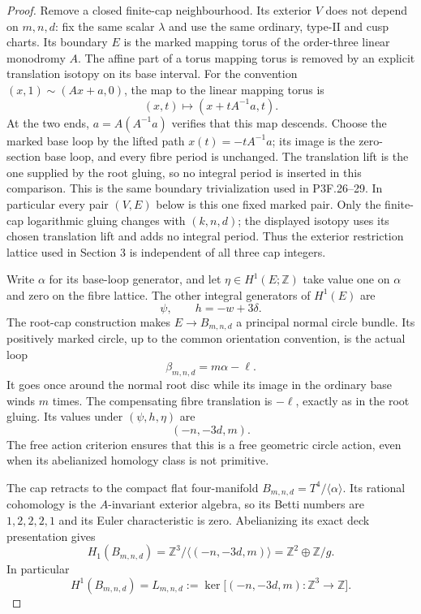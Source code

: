 \begin{proof}
Remove a closed finite-cap neighbourhood. Its exterior \(V\) does not depend on \(m,n,d\): fix the same scalar \(\lambda\) and use the same ordinary, type-II and cusp charts. Its boundary \(E\) is the marked mapping torus of the order-three linear monodromy \(A\). The affine part of a torus mapping torus is removed by an explicit translation isotopy on its base interval. For the convention \((x,1)\sim(Ax+a,0)\), the map to the linear mapping torus is \[
                    (x,t)\longmapsto(x+tA^{-1}a,t).
\] At the two ends, \(a=A(A^{-1}a)\) verifies that this map descends. Choose the marked base loop by the lifted path \(x(t)=-tA^{-1}a\); its image is the zero-section base loop, and every fibre period is unchanged. The translation lift is the one supplied by the root gluing, so no integral period is inserted in this comparison. This is the same boundary trivialization used in P3F.26--29. In particular every pair \((V,E)\) below is this one fixed marked pair. Only the finite-cap logarithmic gluing changes with \((k,n,d)\); the displayed isotopy uses its chosen translation lift and adds no integral period. Thus the exterior restriction lattice used in Section 3 is independent of all three cap integers.

Write \(\alpha\) for its base-loop generator, and let \(\eta\in H^1(E;\mathbb Z)\) take value one on \(\alpha\) and zero on the fibre lattice. The other integral generators of \(H^1(E)\) are \[
 \psi,\qquad h=-w+3\delta.
\] The root-cap construction makes \(E\to B_{m,n,d}\) a principal normal circle bundle. Its positively marked circle, up to the common orientation convention, is the actual loop \[
             \beta_{m,n,d}=m\alpha-\ell.             \tag{P3F.34.3}
\] It goes once around the normal root disc while its image in the ordinary base winds \(m\) times. The compensating fibre translation is \(-\ell\), exactly as in the root gluing. Its values under \((\psi,h,\eta)\) are \[
                         (-n,-3d,m).
\] The free action criterion ensures that this is a free geometric circle action, even when its abelianized homology class is not primitive.

The cap retracts to the compact flat four-manifold \(B_{m,n,d}=T^4/\langle\alpha\rangle\). Its rational cohomology is the \(A\)-invariant exterior algebra, so its Betti numbers are \(1,2,2,2,1\) and its Euler characteristic is zero. Abelianizing its exact deck presentation gives \[
 H_1(B_{m,n,d})=\mathbb Z^3/\langle(-n,-3d,m)\rangle
               =\mathbb Z^2\oplus\mathbb Z/g.
\] In particular \[
 H^1(B_{m,n,d})=
 L_{m,n,d}:=\ker\bigl[(-n,-3d,m):\mathbb Z^3\to\mathbb Z\bigr].
                                                               \tag{P3F.34.4}
\]


\end{proof}
